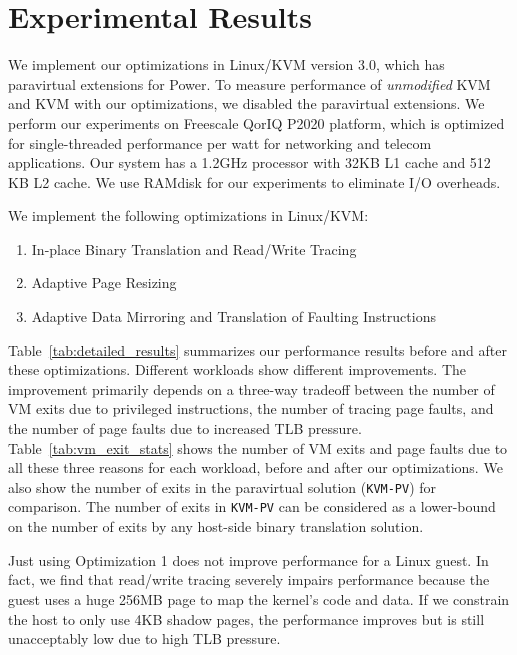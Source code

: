 \documentclass[10pt,twocolumn]{article}
\begin{document}
\section{Experimental Results}
\label{sec:results}
We implement our optimizations in Linux/KVM version 3.0, which
has paravirtual extensions for Power. To measure performance of
{\em unmodified} KVM and KVM with our optimizations,
we disabled the paravirtual extensions. We perform our experiments
on Freescale QorIQ P2020 platform, which is optimized for single-threaded
performance per watt for networking and telecom applications. Our
system has a 1.2GHz processor with 32KB L1 cache and 512 KB L2 cache.
We use RAMdisk for our experiments to eliminate I/O
overheads.

We implement the following optimizations in Linux/KVM:
\begin{enumerate}
  \item In-place Binary Translation and Read/Write Tracing
  \item Adaptive Page Resizing
  \item Adaptive Data Mirroring and Translation of Faulting Instructions
\end{enumerate}
Table~\ref{tab:detailed_results} summarizes our performance results before and
after these optimizations.
Different workloads show different improvements. The improvement primarily depends
on a three-way tradeoff between the number of VM exits due to privileged
instructions, the number of
tracing page faults, and the number of page faults due to increased TLB pressure.
Table~\ref{tab:vm_exit_stats} shows the number of VM exits and page faults due
to all these three reasons for each workload, before and after our optimizations.
We also show the number of exits in the paravirtual solution ({\tt KVM-PV}) for
comparison. The number of exits in {\tt KVM-PV} can be considered as a
lower-bound on the number of exits by any host-side binary translation solution.

Just using Optimization 1 does not improve performance for a Linux guest.
In fact, we find that read/write tracing severely impairs performance because
the guest uses a huge 256MB page to map the kernel's code and data. If we
constrain the host to only use 4KB shadow pages, the performance improves
but is still unacceptably low due to high TLB pressure.
\end{document}
